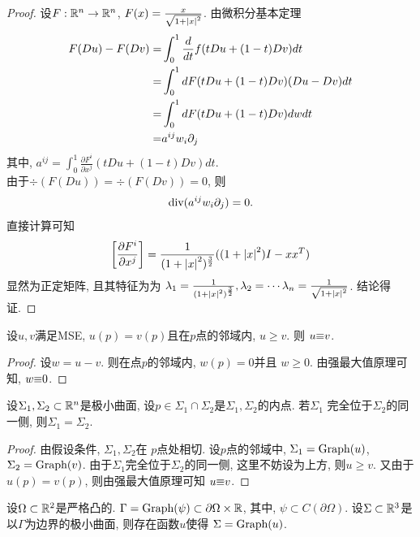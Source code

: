 \begin{proof}
    设$F: {\mathbb{R}}^n \to {\mathbb{R}}^n$, $F(x)=\frac{x}{\sqrt{1+{\left | x \right |}^2}}$. 由微积分基本定理
    \begin{equation}
        \begin{split}
            F(Du)-F(Dv)= & \int^1_0 \frac{d}{dt} f(tDu+(1-t)Dv)dt \\
            =& \int^1_0 dF(tDu+(1-t)Dv)(Du-Dv)dt\\
            =& \int^1_0 dF(tDu+(1-t)Dv)dwdt\\
            =& a^{ij}w_i{\partial_j}
        \end{split} 
    \end{equation}
    其中, $a^{ij}=\int^1_0 \frac{\partial F^i}{\partial x^j}(tDu+(1-t)Dv)dt$. \\
    由于$\div(F(Du)) = \div(F(Dv))=0$, 则
    \begin{equation}
        {\text{div}}(a^{ij}w_i{\partial_j})=0.
    \end{equation}
    直接计算可知
    \begin{equation}
        \left[\frac{\partial F^i}{\partial x^j}\right] = \frac{1}{(1+{\left | x \right |}^2)^\frac{3}{2}}((1+{\left | x \right |}^2)I-xx^T)
    \end{equation}
    显然为正定矩阵, 且其特征为为 $\lambda_1=\frac{1}{(1+{\left | x \right |}^2)^{\frac{3}{2}}}, \lambda_2=\cdots\lambda_n=\frac{1}{\sqrt{1+{\left | x \right |}^2}}$. 结论得证.
\end{proof}
\begin{corollary}
    设$u,v$满足MSE, $u(p)=v(p)$且在$p$点的邻域内, $u \ge v$. 则 $u{\equiv} v$.
\end{corollary}
\begin{proof}
    设$w=u-v$. 则在点$p$的邻域内, $w(p)=0$并且 $w \ge 0$. 由强最大值原理可知, $w{\equiv} 0$.
\end{proof}
\begin{corollary}
    设$\Sigma_1,\Sigma_2 \subset {\mathbb{R}}^n$是极小曲面, 设$p \in \Sigma_1 \cap \Sigma_2$是$\Sigma_1,\Sigma_2$的内点. 若$\Sigma_1$ 完全位于$\Sigma_2$的同一侧, 则$\Sigma_1=\Sigma_2$.
\end{corollary}
\begin{proof}
    由假设条件, $\Sigma_1,\Sigma_2$在 $p$点处相切. 设$p$点的邻域中, $\Sigma_1=\text{Graph}(u)$, $\Sigma_2=\text{Graph}(v)$. 由于$\Sigma_1$完全位于$\Sigma_2$的同一侧, 这里不妨设为上方, 则$u \ge v$. 又由于$u(p)=v(p)$, 则由强最大值原理可知  $u {\equiv} v$.
\end{proof}
\begin{theorem}
    设$\Omega \subset {\mathbb{R}}^2$是严格凸的. $\Gamma =\text{Graph}(\psi) \subset \partial \Omega \times {\mathbb{R}}$, 其中, $\psi \subset C(\partial \Omega)$. 设$\Sigma \subset {\mathbb{R}}^3$是以$\Gamma$为边界的极小曲面, 则存在函数$u$使得 $\Sigma=\text{Graph}(u)$.
\end{theorem}
